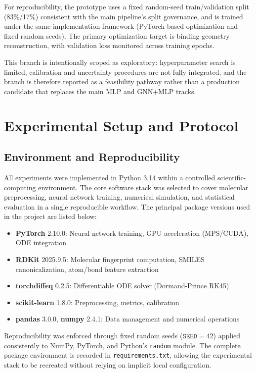 \documentclass[a4paper,11pt,twoside]{report}
\begin{document}
For reproducibility, the prototype uses a fixed random-seed train/validation split (83\%/17\%) consistent with the main pipeline's split governance, and is trained under the same implementation framework (PyTorch-based optimization and fixed random seeds). The primary optimization target is binding geometry reconstruction, with validation loss monitored across training epochs.

This branch is intentionally scoped as exploratory: hyperparameter search is limited, calibration and uncertainty procedures are not fully integrated, and the branch is therefore reported as a feasibility pathway rather than a production candidate that replaces the main MLP and GNN+MLP tracks.

\chapter{Experimental Setup and Protocol}

\section{Environment and Reproducibility}

All experiments were implemented in Python 3.14 within a controlled scientific-computing environment. The core software stack was selected to cover molecular preprocessing, neural network training, numerical simulation, and statistical evaluation in a single reproducible workflow. The principal package versions used in the project are listed below:
\begin{itemize}
  \item \textbf{PyTorch} 2.10.0: Neural network training, GPU acceleration (MPS/CUDA), ODE integration
  \item \textbf{RDKit} 2025.9.5: Molecular fingerprint computation, SMILES canonicalization, atom/bond feature extraction
  \item \textbf{torchdiffeq} 0.2.5: Differentiable ODE solver (Dormand-Prince RK45)
  \item \textbf{scikit-learn} 1.8.0: Preprocessing, metrics, calibration
  \item \textbf{pandas} 3.0.0, \textbf{numpy} 2.4.1: Data management and numerical operations
\end{itemize}

\noindent Reproducibility was enforced through fixed random seeds ($\texttt{SEED}=42$) applied consistently to NumPy, PyTorch, and Python's \texttt{random} module. The complete package environment is recorded in \texttt{requirements.txt}, allowing the experimental stack to be recreated without relying on implicit local configuration.
\end{document}
